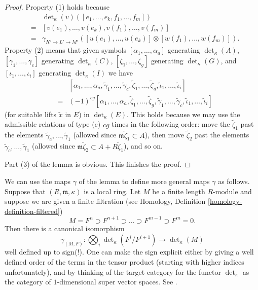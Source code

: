 \begin{proof}
\medskip\noindent
Property (1) holds because
\begin{eqnarray*}
& & \det\nolimits_\kappa(v)([e_1, \ldots, e_k, f_1, \ldots, f_m]) \\
& = &
[v(e_1), \ldots, v(e_k), v(f_1), \ldots, v(f_m)] \\
& = &
\gamma_{K' \to L' \to M'}([u(e_1), \ldots, u(e_k)]
\otimes [w(f_1), \ldots, w(f_m)]).
\end{eqnarray*}
Property (2) means that given symbols
$[\alpha_1, \ldots, \alpha_a]$ generating $\det_\kappa(A)$,
$[\gamma_1, \ldots, \gamma_c]$ generating $\det_\kappa(C)$,
$[\zeta_1, \ldots, \zeta_g]$ generating $\det_\kappa(G)$, and
$[\iota_1, \ldots, \iota_i]$ generating $\det_\kappa(I)$
we have
\begin{eqnarray*}
& & [\alpha_1, \ldots, \alpha_a, \tilde\gamma_1, \ldots, \tilde\gamma_c,
\tilde\zeta_1, \ldots, \tilde\zeta_g, \tilde\iota_1, \ldots, \tilde\iota_i] \\
& = &
(-1)^{cg} [\alpha_1, \ldots, \alpha_a, \tilde\zeta_1, \ldots, \tilde\zeta_g,
\tilde\gamma_1, \ldots, \tilde\gamma_c, \tilde\iota_1, \ldots, \tilde\iota_i]
\end{eqnarray*}
(for suitable lifts $\tilde{x}$ in $E$) in $\det_\kappa(E)$.
This holds because we may use the admissible relations of type (c)
$cg$ times in the following order: move the
$\tilde\zeta_1$ past the elements
$\tilde\gamma_c, \ldots, \tilde\gamma_1$
(allowed since $\mathfrak m\tilde\zeta_1 \subset A$),
then move $\tilde\zeta_2$ past the elements
$\tilde\gamma_c, \ldots, \tilde\gamma_1$
(allowed since $\mathfrak m\tilde\zeta_2 \subset A + R\tilde\zeta_1$),
and so on.

\medskip\noindent
Part (3) of the lemma is obvious.
This finishes the proof.
\end{proof}

\noindent
We can use the maps $\gamma$ of the lemma to define more general maps
$\gamma$ as follows. Suppose that $(R, \mathfrak m, \kappa)$ is a
local ring. Let $M$ be a finite length $R$-module and suppose we 
are given a finite filtration (see
Homology, Definition \ref{homology-definition-filtered})
$$
M = F^n \supset F^{n + 1} \supset \ldots \supset F^{m - 1} \supset F^m = 0.
$$
Then there is a canonical isomorphism
$$
\gamma_{(M, F)} :
\bigotimes\nolimits_i \det\nolimits_\kappa(F^i/F^{i + 1})
\longrightarrow
\det\nolimits_\kappa(M)
$$
well defined up to sign(!). One can make the sign explicit either by
giving a well defined order of the terms in the tensor product (starting with
higher indices unfortunately), and by thinking of the target category for
the functor $\det_\kappa$ as the category of
$1$-dimensional super vector spaces. See \cite[Section 1]{determinant}.

